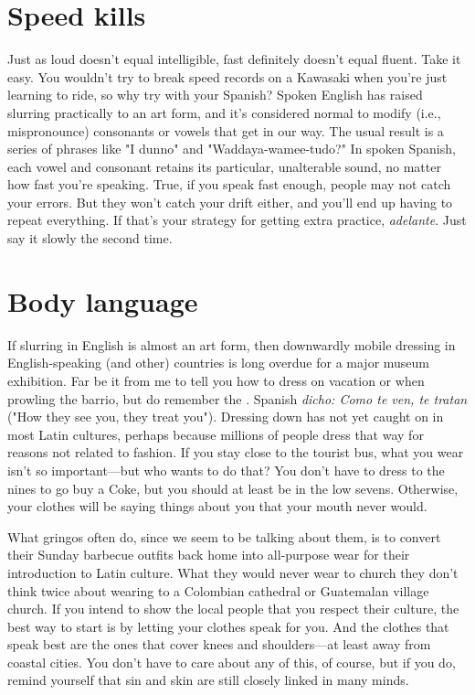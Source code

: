 \documentclass[14pt,a4paper,oneside]{memoir}
\begin{document}
\section{Speed kills}

Just as loud doesn't equal intelligible, fast definitely doesn't
equal fluent. Take it easy. You wouldn't try to break speed records on a
Kawasaki when you're just learning to ride, so why try with your Spanish? Spoken English has raised slurring practically to an art form, and
it's considered normal to modify (i.e., mispronounce) consonants or
vowels that get in our way. The usual result is a series of phrases like
"I dunno" and "Waddaya-wamee-tudo?" In spoken Spanish, each vowel
and consonant retains its particular, unalterable sound, no matter how
fast you're speaking. True, if you speak fast enough, people may not
catch your errors. But they won't catch your drift either, and you'll end
up having to repeat everything. If that's your strategy for getting extra
practice, \emph{adelante}. Just say it slowly the second time.

\section{Body language}

If slurring in English is almost an art form, then downwardly
mobile dressing in English-speaking (and other) countries is long overdue for a major museum exhibition. Far be it from me to tell you how
to dress on vacation or when prowling the barrio, but do remember the
. Spanish \emph{dicho: Como te ven, te tratan} ("How they see you, they treat
you"). Dressing down has not yet caught on in most Latin cultures,
perhaps because millions of people dress that way for reasons not related to fashion. If you stay close to the tourist bus, what you wear
isn't so important---but who wants to do that? You don't have to dress
to the nines to go buy a Coke, but you should at least be in the low
sevens. Otherwise, your clothes will be saying things about you that
your mouth never would.

What gringos often do, since we seem to be talking about
them, is to convert their Sunday barbecue outfits back home into all-purpose wear for their introduction to Latin culture. What they would
never wear to church they don't think twice about wearing to a Colombian cathedral or Guatemalan village church. If you intend to show the
local people that you respect their culture, the best way to start is by
letting your clothes speak for you. And the clothes that speak best are
the ones that cover knees and shoulders---at least away from coastal
cities. You don't have to care about any of this, of course, but if you
do, remind yourself that sin and skin are still closely linked in many
minds.
\end{document}
